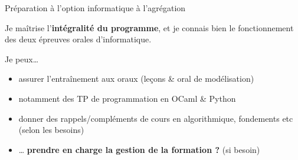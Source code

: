 \documentclass[11pt,english,ignorenonframetext,]{beamer}
\providecommand{\tightlist}{%
  \setlength{\itemsep}{0pt}\setlength{\parskip}{0pt}}
\begin{document}
\begin{frame}{Préparation à \textcolor{info}{l'option informatique} à l'agrégation}

Je maîtrise l'\textbf{intégralité du programme}, et je connais bien le fonctionnement des \textcolor{info}{deux épreuves orales d'informatique}.

\pause
Je peux\ldots{}

\begin{itemize}
\tightlist
\item
  assurer l'entraînement aux oraux (leçons \& oral de modélisation)
\item
  notamment des TP de programmation en OCaml \& Python
\item
  donner des rappels/compléments de cours en algorithmique, fondements etc (selon les besoins)
\end{itemize}

\pause
\vspace*{10pt}

\begin{itemize}
\tightlist
\item
  \ldots{} \textbf{prendre en charge la gestion de la formation ?} (si besoin)
\end{itemize}

\end{frame}





\end{document}
